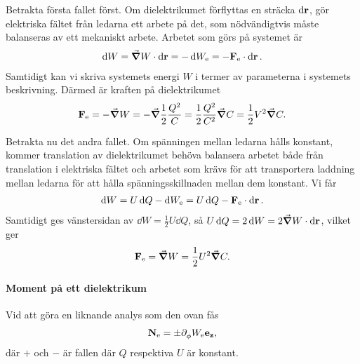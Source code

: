 Betrakta första fallet först. Om dielektrikumet förflyttas en sträcka $\dd{\vb{r}}$, gör elektriska fältet från ledarna ett arbete på det, som nödvändigtvis måste balanseras av ett mekaniskt arbete. Arbetet som görs på systemet är
\begin{align*}
	\dd{W} = \grad{W}\cdot\dd{\vb{r}} = -\dd{W_{\text{e}}} = -\vb{F}_{\text{e}}\cdot\dd{\vb{r}}.
\end{align*}
Samtidigt kan vi skriva systemets energi $W$ i termer av parameterna i systemets beskrivning. Därmed är kraften på dielektrikumet
\begin{align*}
	\vb{F}_{\text{e}} = -\grad{W} = -\grad{\frac{1}{2}\frac{Q^{2}}{C}} = \frac{1}{2}\frac{Q^{2}}{C^{2}}\grad{C} = \frac{1}{2}V^{2}\grad{C}.
\end{align*}

Betrakta nu det andra fallet. Om spänningen mellan ledarna hålls konstant, kommer translation av dielektrikumet behöva balansera arbetet både från translation i elektriska fältet och arbetet som krävs för att transportera laddning mellan ledarna för att hålla spänningsskillnaden mellan dem konstant. Vi får 
\begin{align*}
	\dd{W} = U\dd{Q} - \dd{W_{\text{e}}} = U\dd{Q} - \vb{F}_{\text{e}}\cdot\dd{\vb{r}}.
\end{align*}
Samtidigt ges vänstersidan av $\dd{W} = \frac{1}{2}U\dd{Q}$, så $U\dd{Q} = 2\dd{W} = 2\grad{W}\cdot\dd{\vb{r}}$, vilket ger
\begin{align*}
	\vb{F}_{\text{e}} = \grad{W} = \frac{1}{2}U^{2}\grad{C}.
\end{align*}

\paragraph{Moment på ett dielektrikum}
Vid att göra en liknande analys som den ovan fås
\begin{align*}
	\vb{N}_{\text{e}} = \pm\partial_{\phi}^{}W_{\text{e}}\vb{e}_{\vb{z}},
\end{align*}
där $+$ och $-$ är fallen där $Q$ respektiva $U$ är konstant.